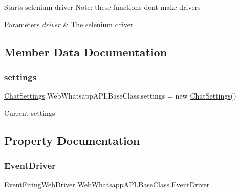 Starts selenium driver Note\+: these functions don\textquotesingle{}t make drivers 


\begin{DoxyParams}{Parameters}
{\em driver} & The selenium driver\\
\hline
\end{DoxyParams}


\subsection{Member Data Documentation}
\mbox{\label{class_web_whatsapp_a_p_i_1_1_base_class_af7b5c73d834b7c97f6aa1947310af34e}} 
\subsubsection{\texorpdfstring{settings}{settings}}
{\footnotesize\ttfamily \hyperlink{class_web_whatsapp_a_p_i_1_1_base_class_1_1_chat_settings}{Chat\+Settings} Web\+Whatsapp\+A\+P\+I.\+Base\+Class.\+settings = new \hyperlink{class_web_whatsapp_a_p_i_1_1_base_class_1_1_chat_settings}{Chat\+Settings}()}



Current settings 



\subsection{Property Documentation}
\mbox{\label{class_web_whatsapp_a_p_i_1_1_base_class_a1db62394318cea6839e32f2820fb426f}} 
\subsubsection{\texorpdfstring{Event\+Driver}{EventDriver}}
{\footnotesize\ttfamily Event\+Firing\+Web\+Driver Web\+Whatsapp\+A\+P\+I.\+Base\+Class.\+Event\+Driver\hspace{0.3cm}{\ttfamily [get]}}



